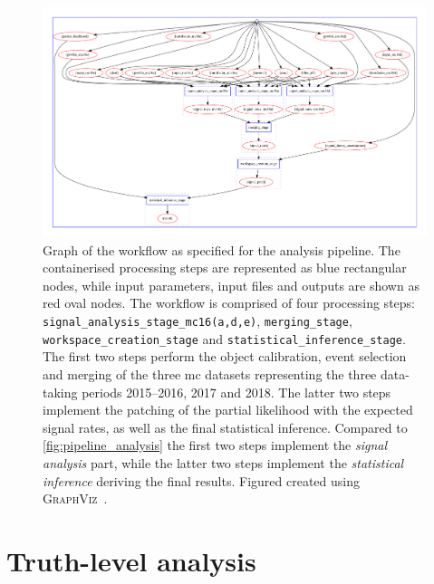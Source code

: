  \begin{figure}
	\centering\includegraphics[width=1.0\textwidth]{yadage_workflow_instance}
	\caption{Graph of the workflow as specified for the analysis pipeline. The containerised processing steps are represented as blue rectangular nodes, while input parameters, input files and outputs are shown as red oval nodes. The workflow is comprised of four processing steps: \texttt{signal\_analysis\_stage\_mc16(a,d,e)}, \texttt{merging\_stage}, \texttt{workspace\_creation\_stage} and \texttt{statistical\_inference\_stage}. The first two steps perform the object calibration, event selection and merging of the three \gls{mc} datasets representing the three data-taking periods 2015--2016, 2017 and 2018. The latter two steps implement the patching of the partial likelihood with the expected signal rates, as well as the final statistical inference. Compared to \cref{fig:pipeline_analysis} the first two steps implement the \textit{signal analysis} part, while the latter two steps implement the \textit{statistical inference} deriving the final results. Figured created using \textsc{GraphViz}~\cite{Gansner00anopen,neato}.} 
	\label{fig:recast_workflow}
\end{figure}



\section{Truth-level analysis}\label{sec:truth_analysis}

\graphicspath{{chapter-pmssm/Figs/Vector/}{chapter-pmssm/Figs/}}


